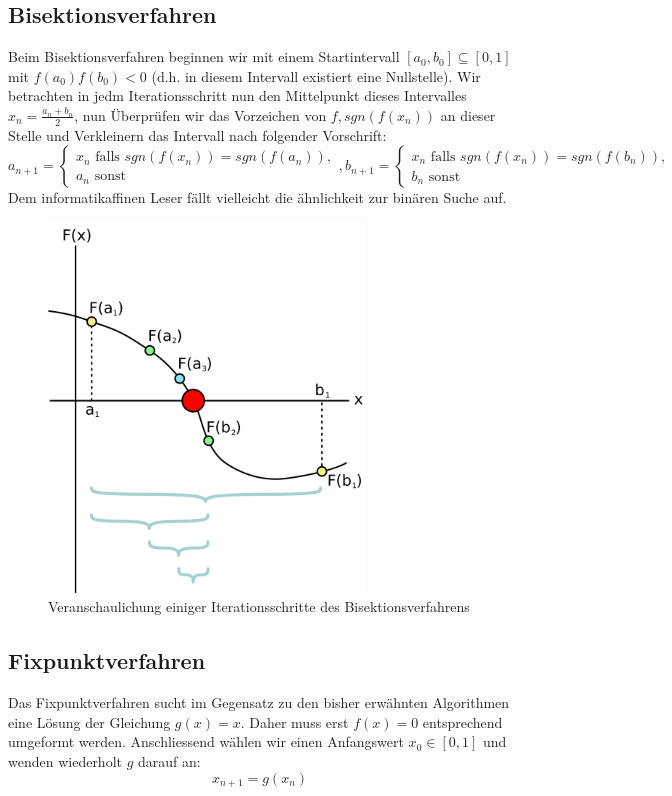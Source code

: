 \documentclass[a4paper,12pt]{article}
\newcommand{\1}{1\hspace{-0,9ex}1}
\begin{document}
\subsection*{Bisektionsverfahren}
Beim Bisektionsverfahren beginnen wir mit einem Startintervall $[a_0, b_0] \subseteq [0,1]$ mit $f(a_0)f(b_0) < 0$ (d.h. in diesem Intervall existiert eine Nullstelle). Wir betrachten in jedm Iterationsschritt nun den Mittelpunkt dieses Intervalles $x_n = \frac{a_n + b_n}{2}$, nun Überprüfen wir das Vorzeichen von $f, sgn(f(x_n))$ an dieser Stelle und Verkleinern das Intervall nach folgender Vorschrift:
\[
	a_{n+1} = \begin{cases}
		x_n\text{ falls } sgn(f(x_n))=sgn(f(a_n)), \\
		a_n\text{ sonst}
	\end{cases}, b_{n+1} = \begin{cases}
		x_n\text{ falls } sgn(f(x_n))=sgn(f(b_n)), \\
		b_n\text{ sonst}
	\end{cases}
\]
Dem informatikaffinen Leser fällt vielleicht die ähnlichkeit zur binären Suche auf.
\begin{figure}[H]
	\centering
	\includegraphics[width=0.75\textwidth]{plots/Bisection_method.png}
	\caption{Veranschaulichung einiger Iterationsschritte des Bisektionsverfahrens}
\end{figure}
\subsection*{Fixpunktverfahren}
Das Fixpunktverfahren sucht im Gegensatz zu den bisher erwähnten Algorithmen eine Lösung der Gleichung $g(x)=x$. Daher muss erst $f(x)=0$ entsprechend umgeformt werden. Anschliessend wählen wir einen Anfangswert $x_0\in[0,1]$ und wenden wiederholt $g$ darauf an:
\[
	x_{n+1}=g(x_n)
\]
\end{document}
